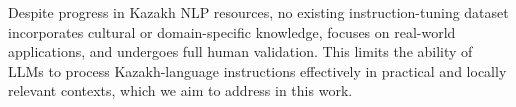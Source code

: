
Despite progress in Kazakh NLP resources, no existing instruction-tuning dataset incorporates cultural or domain-specific knowledge, focuses on real-world applications, and undergoes full human validation. This limits the ability of LLMs to process Kazakh-language instructions effectively in practical and locally relevant contexts, which we aim to address in this work.



